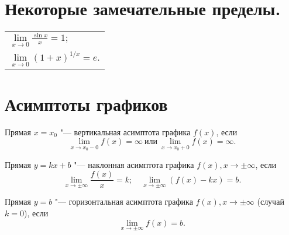 \section{Некоторые замечательные пределы.}
\begin{longtable}[l]{l}
$\lim\limits_{x\to0}\frac{\sin x}{x}=1;$
\\
$\lim\limits_{x\to0} (1+x)^{1/x}=e.$
\end{longtable}

\section{Асимптоты графиков}
\textbullet \quad
Прямая $x=x_0$ "--- вертикальная асимптота графика $f(x)$, если $$\lim\limits_{x\to x_0-0}f(x)=\infty\ \text{или}\ \lim\limits_{x\to x_0+0}f(x)=\infty.$$ 

\textbullet \quad
Прямая $y=kx+b$ "--- наклонная асимптота графика $f(x), x\to\pm\infty$, если $$\lim\limits_{x\to\pm\infty}\frac{f(x)}{x}=k; \quad \lim\limits_{x\to\pm\infty} (f(x)-kx)=b.$$

\textbullet \quad
Прямая $y=b$ "--- горизонтальная асимптота графика $f(x), x\to\pm\infty$ (случай $k=0$), если $$ \lim\limits_{x\to\pm\infty} f(x)=b.$$

\resetHeadWidth
